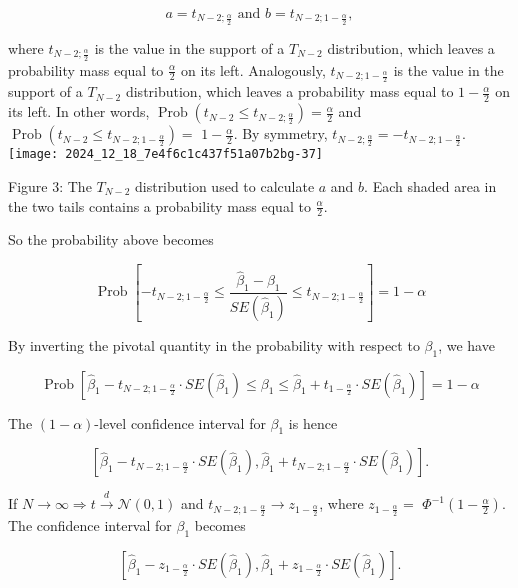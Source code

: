 $$
a=t_{N-2 ; \frac{\alpha}{2}} \text { and } b=t_{N-2 ; 1-\frac{\alpha}{2}},
$$

where $t_{N-2 ; \frac{\alpha}{2}}$ is the value in the support of a $T_{N-2}$ distribution, which leaves a probability mass equal to $\frac{\alpha}{2}$ on its left. Analogously, $t_{N-2 ; 1-\frac{\alpha}{2}}$ is the value in the support of a $T_{N-2}$ distribution, which leaves a probability mass equal to $1-\frac{\alpha}{2}$ on its left. In other words, $\operatorname{Prob}\left(t_{N-2} \leq t_{N-2 ; \frac{\alpha}{2}}\right)=\frac{\alpha}{2}$ and $\operatorname{Prob}\left(t_{N-2} \leq t_{N-2 ; 1-\frac{\alpha}{2}}\right)=$ $1-\frac{\alpha}{2}$. By symmetry, $t_{N-2 ; \frac{\alpha}{2}}=-t_{N-2 ; 1-\frac{\alpha}{2}}$.\\
\texttt{[image: 2024\_12\_18\_7e4f6c1c437f51a07b2bg-37]}

Figure 3: The $T_{N-2}$ distribution used to calculate $a$ and $b$. Each shaded area in the two tails contains a probability mass equal to $\frac{\alpha}{2}$.

So the probability above becomes

$$
\operatorname{Prob}\left[-t_{N-2 ; 1-\frac{\alpha}{2}} \leq \frac{\widehat{\beta}_{1}-\beta_{1}}{S E\left(\widehat{\beta}_{1}\right)} \leq t_{N-2 ; 1-\frac{\alpha}{2}}\right]=1-\alpha
$$

By inverting the pivotal quantity in the probability with respect to $\beta_{1}$, we have

$$
\operatorname{Prob}\left[\widehat{\beta}_{1}-t_{N-2 ; 1-\frac{\alpha}{2}} \cdot S E\left(\widehat{\beta}_{1}\right) \leq \beta_{1} \leq \widehat{\beta}_{1}+t_{1-\frac{\alpha}{2}} \cdot S E\left(\widehat{\beta}_{1}\right)\right]=1-\alpha
$$

The $(1-\alpha)$-level confidence interval for $\beta_{1}$ is hence

$$
\left[\widehat{\beta}_{1}-t_{N-2 ; 1-\frac{\alpha}{2}} \cdot S E\left(\widehat{\beta}_{1}\right), \widehat{\beta}_{1}+t_{N-2 ; 1-\frac{\alpha}{2}} \cdot S E\left(\widehat{\beta}_{1}\right)\right] .
$$

If $N \longrightarrow \infty \Longrightarrow t \xrightarrow{d} \mathcal{N}(0,1)$ and $t_{N-2 ; 1-\frac{\alpha}{2}} \longrightarrow z_{1-\frac{\alpha}{2}}$, where $z_{1-\frac{\alpha}{2}}=$ $\Phi^{-1}\left(1-\frac{\alpha}{2}\right)$. The confidence interval for $\beta_{1}$ becomes

$$
\left[\widehat{\beta}_{1}-z_{1-\frac{\alpha}{2}} \cdot S E\left(\widehat{\beta}_{1}\right), \widehat{\beta}_{1}+z_{1-\frac{\alpha}{2}} \cdot S E\left(\widehat{\beta}_{1}\right)\right] .
$$

